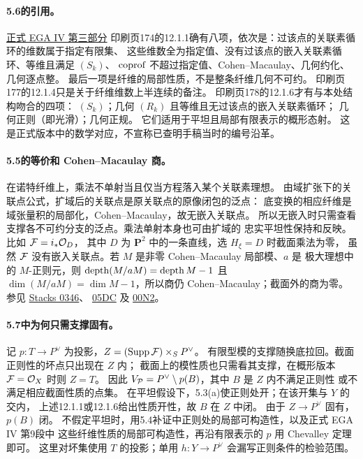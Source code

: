 \paragraph{5.6的引用。}
\href{https://www.numdam.org/item/PMIHES_1966__28__5_0/}{正式 EGA IV 第三部分}
印刷页174的12.1.1确有八项，依次是：过该点的关联素循环的维数属于指定有限集、
这些维数全为指定值、没有过该点的嵌入关联素循环、等维且满足 $(S_k)$、
$\operatorname{coprof}$ 不超过指定值、Cohen--Macaulay、几何约化、几何逐点整。
最后一项是纤维的局部性质，不是整条纤维几何不可约。
印刷页177的12.1.4只是关于纤维维数上半连续的备注。
印刷页178的12.1.6才有与本处结构吻合的四项：
$(S_k)$；几何 $(R_k)$ 且等维且无过该点的嵌入关联素循环；
几何正则（即光滑）；几何正规。
它们适用于平坦且局部有限表示的概形态射。
这是正式版本中的数学对应，不宣称已查明手稿当时的编号沿革。

\paragraph{5.5的等价和 Cohen--Macaulay 商。}
在诺特纤维上，乘法不单射当且仅当方程落入某个关联素理想。
由域扩张下的关联点公式，扩域后的关联点是原关联点的原像闭包的泛点：
底变换的相应纤维是域张量积的局部化，Cohen--Macaulay，故无嵌入关联点。
所以无嵌入时只需查看支撑各不可约分支的泛点。乘法单射本身也可由扩域的
忠实平坦性保持和反映。比如 $\mathcal F=i_*\mathcal O_D$，
其中 $D$ 为 $\mathbf P^2$ 中的一条直线，选 $H_\xi=D$ 时截面乘法为零，
虽然 $\mathcal F$ 没有嵌入关联点。若 $M$ 是非零 Cohen--Macaulay 局部模、$a$ 是
极大理想中的 $M$-正则元，则 $\operatorname{depth}(M/aM)=\operatorname{depth} M-1$ 且
$\dim(M/aM)=\dim M-1$，所以商仍 Cohen--Macaulay；截面外的商为零。
参见 \href{https://stacks.math.columbia.edu/tag/0346}{Stacks 0346}、
\href{https://stacks.math.columbia.edu/tag/05DC}{05DC} 及
\href{https://stacks.math.columbia.edu/tag/00N2}{00N2}。

\paragraph{5.7中为何只需支撑固有。}
记 $p:T\to P^\vee$ 为投影，$Z=(\operatorname{Supp}\mathcal F)\times_S P^\vee$。
有限型模的支撑随换底拉回。截面正则性的坏点只出现在 $Z$ 内；
截面上的模性质也只需看其支撑，在概形版本 $\mathcal F=\mathcal O_X$ 时则 $Z=T$。
因此 $V_{\mathcal P}=P^\vee\setminus p(B)$，其中 $B$ 是 $Z$ 内不满足正则性
或不满足相应截面性质的点集。
在平坦假设下，5.3(a)使正则处开；在该开集与 $Y$ 的交内，
上述12.1.1或12.1.6给出性质开性，故 $B$ 在 $Z$ 中闭。
由于 $Z\to P^\vee$ 固有，$p(B)$ 闭。
不假定平坦时，用5.4补证中正则处的局部可构造性，以及正式 EGA IV 第9段中
这些纤维性质的局部可构造性，再沿有限表示的 $p$ 用 Chevalley 定理即可。
这里对坏集使用 $T$ 的投影；单用 $h:Y\to P^\vee$ 会漏写正则条件的检验范围。

